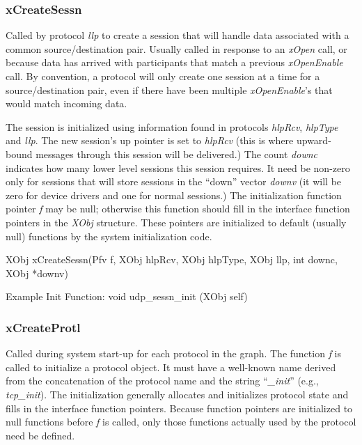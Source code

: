 \subsubsection{xCreateSessn}\label{xCreateSessn}

Called by protocol {\em llp} to create a session that will handle data
associated with a common source/destination pair. Usually called in
response to an {\em xOpen} call, or because data has arrived with
participants that match a previous {\em xOpenEnable} call.  By
convention, a protocol will only create one session at a time for a
source/destination pair, even if there have been multiple {\em
xOpenEnable}'s that would match incoming data.

The session is initialized using information found in protocols {\em hlpRcv},
{\em hlpType} and {\em llp}.  The new session's up pointer is set to
{\em hlpRcv} (this is where upward-bound messages through this session
will be delivered.)
The count {\em downc}
indicates how many lower level sessions this session requires.  
It need be non-zero only for sessions that will store
sessions in the ``down'' vector {\em downv} (it will be zero
for device drivers and one for normal sessions.)
The initialization
function pointer {\em f} may be null; otherwise this function should
fill in the interface function pointers in the {\em XObj} structure.
These pointers are initialized to default (usually null) functions by
the system initialization code.  
\medskip

{\sem XObj} {\bold xCreateSessn}({\sem Pfv} {\caps  f}, 
{\sem XObj} {\caps  hlpRcv}, {\sem XObj} {\caps  hlpType}, 
{\sem XObj} {\caps llp}, {\sem int} {\caps downc}, 
{\sem XObj} *{\caps downv})
\medskip

{\sanss Example Init Function:} {\sem void} {\bold udp\_sessn\_init} ({\sem XObj} {\caps self})

\medskip

\subsubsection{xCreateProtl}

Called during system start-up for each protocol in the graph.  The
function {\em f} is called to initialize a protocol object. It must
have a well-known name derived from the concatenation of the protocol
name and the string ``{\em \_init}'' (e.g., {\em tcp\_init}).  The
initialization generally allocates and initializes protocol state and
fills in the interface function pointers.  Because function pointers
are initialized to null functions before {\em f} is called, only those
functions actually used by the protocol need be defined.


